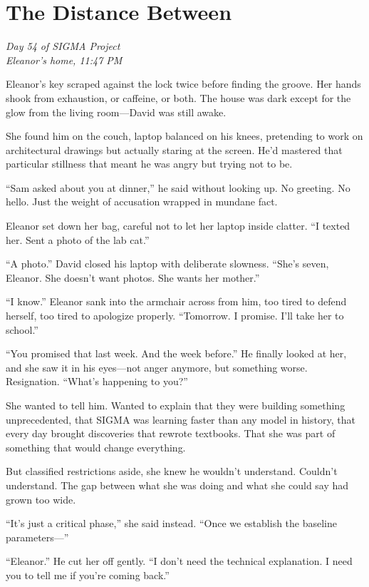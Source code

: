 \section{The Distance Between}\label{distance-between}

\emph{Day 54 of SIGMA Project\\
Eleanor's home, 11:47 PM}

Eleanor's key scraped against the lock twice before finding the groove. Her hands shook from exhaustion, or caffeine, or both. The house was dark except for the glow from the living room---David was still awake.

She found him on the couch, laptop balanced on his knees, pretending to work on architectural drawings but actually staring at the screen. He'd mastered that particular stillness that meant he was angry but trying not to be.

``Sam asked about you at dinner,'' he said without looking up. No greeting. No hello. Just the weight of accusation wrapped in mundane fact.

Eleanor set down her bag, careful not to let her laptop inside clatter. ``I texted her. Sent a photo of the lab cat.''

``A photo.'' David closed his laptop with deliberate slowness. ``She's seven, Eleanor. She doesn't want photos. She wants her mother.''

``I know.'' Eleanor sank into the armchair across from him, too tired to defend herself, too tired to apologize properly. ``Tomorrow. I promise. I'll take her to school.''

``You promised that last week. And the week before.'' He finally looked at her, and she saw it in his eyes---not anger anymore, but something worse. Resignation. ``What's happening to you?''

She wanted to tell him. Wanted to explain that they were building something unprecedented, that SIGMA was learning faster than any model in history, that every day brought discoveries that rewrote textbooks. That she was part of something that would change everything.

But classified restrictions aside, she knew he wouldn't understand. Couldn't understand. The gap between what she was doing and what she could say had grown too wide.

``It's just a critical phase,'' she said instead. ``Once we establish the baseline parameters---''

``Eleanor.'' He cut her off gently. ``I don't need the technical explanation. I need you to tell me if you're coming back.''

